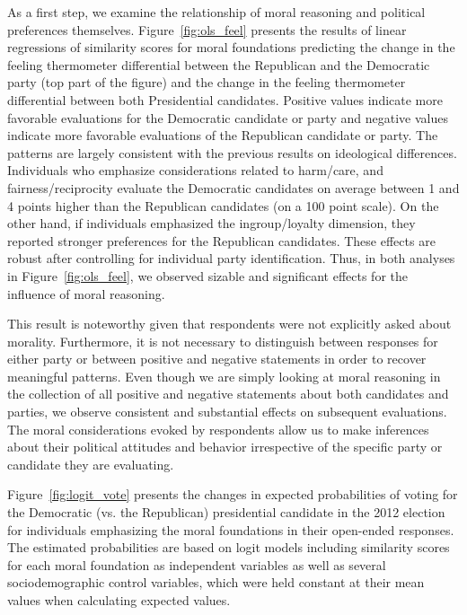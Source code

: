 \documentclass[12pt]{article}
\begin{document}
As a first step, we examine the relationship of moral reasoning and political preferences themselves. Figure~\ref{fig:ols_feel} presents the results of linear regressions of similarity scores for moral foundations predicting the change in the feeling thermometer differential between the Republican and the Democratic party (top part of the figure) and the change in the feeling thermometer differential between both Presidential candidates. Positive values indicate more favorable evaluations for the Democratic candidate or party and negative values indicate more favorable evaluations of the Republican candidate or party. The patterns are largely consistent with the previous results on ideological differences. Individuals who emphasize considerations related to harm/care, and fairness/reciprocity evaluate the Democratic candidates on average between 1 and 4 points higher than the Republican candidates (on a 100 point scale). On the other hand, if individuals emphasized the ingroup/loyalty dimension, they reported stronger preferences for the Republican candidates. These effects are robust after controlling for individual party identification. Thus, in both analyses in Figure~\ref{fig:ols_feel}, we observed sizable and significant effects for the influence of moral reasoning.

This result is noteworthy given that respondents were not explicitly asked about morality. Furthermore, it is not necessary to distinguish between responses for either party or between positive and negative statements in order to recover meaningful patterns. Even though we are simply looking at moral reasoning in the collection of all positive and negative statements about both candidates and parties, we observe consistent and substantial effects on subsequent evaluations. The moral considerations evoked by respondents allow us to make inferences about their political attitudes and behavior irrespective of the specific party or candidate they are evaluating.

Figure~\ref{fig:logit_vote} presents the changes in expected probabilities of voting for the Democratic (vs. the Republican) presidential candidate in the 2012 election for individuals emphasizing the moral foundations in their open-ended responses. The estimated probabilities are based on logit models including similarity scores for each moral foundation as independent variables as well as several sociodemographic control variables, which were held constant at their mean values when calculating expected values.
\end{document}
